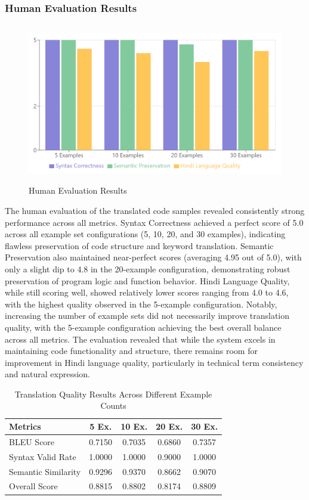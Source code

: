\documentclass[11pt,a4paper]{article}
\begin{document}
\subsubsection{Human Evaluation Results}
\begin{figure}
    \centering
    \includegraphics[width=0.9\linewidth,height=7cm,keepaspectratio]{Graphs/human_eval_graph.png}
    \caption{Human Evaluation Results}
    \label{fig:human-evaluation-results}
\end{figure}
The human evaluation of the translated code samples revealed consistently strong performance across all metrics. Syntax Correctness achieved a perfect score of 5.0 across all example set configurations (5, 10, 20, and 30 examples), indicating flawless preservation of code structure and keyword translation. Semantic Preservation also maintained near-perfect scores (averaging 4.95 out of 5.0), with only a slight dip to 4.8 in the 20-example configuration, demonstrating robust preservation of program logic and function behavior. Hindi Language Quality, while still scoring well, showed relatively lower scores ranging from 4.0 to 4.6, with the highest quality observed in the 5-example configuration. Notably, increasing the number of example sets did not necessarily improve translation quality, with the 5-example configuration achieving the best overall balance across all metrics. The evaluation revealed that while the system excels in maintaining code functionality and structure, there remains room for improvement in Hindi language quality, particularly in technical term consistency and natural expression.
\begin{table}[htbp]
    \small  %
    \centering
    \caption{Translation Quality Results Across Different Example Counts}
    \begin{tabular}{|l|c|c|c|c|}
    \hline
    \textbf{Metrics} & \textbf{5 Ex.} & \textbf{10 Ex.} & \textbf{20 Ex.} & \textbf{30 Ex.} \\
    \hline
    BLEU Score & 0.7150 & 0.7035 & 0.6860 & 0.7357 \\
    \hline
    Syntax Valid Rate & 1.0000 & 1.0000 & 0.9000 & 1.0000 \\
    \hline
    Semantic Similarity & 0.9296 & 0.9370 & 0.8662 & 0.9070 \\
    \hline
    Overall Score & 0.8815 & 0.8802 & 0.8174 & 0.8809 \\
    \hline
    \end{tabular}
    \label{tab:translation-results}
    \end{table}
\end{document}
